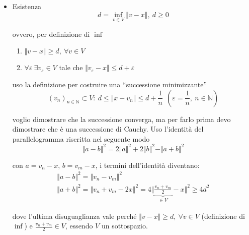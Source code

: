 \documentclass[10pt,a4paper,twoside,openright]{book}
\begin{document}
\begin{dimostrazione}
	
	\begin{itemize}
		\item Esistenza\begin{equation*}
		      d=\inf_{v\in V}\Vert v-x\Vert,\ d\geqslant 0
		\end{equation*}
		
		ovvero, per definizione di $\displaystyle \inf$
		\begin{enumerate}
			\item $\displaystyle \Vert v-x\Vert \geqslant d,\ \forall v\in V$
			\item $\displaystyle \forall \varepsilon \ \exists v_{\varepsilon } \in V$ tale che $\displaystyle \Vert v_{\varepsilon } -x\Vert \leqslant d+\varepsilon $ \ $ $
		\end{enumerate}
		
		uso la definizione per costruire una ``successione minimizzante''
		\begin{equation}
			(v_{n})_{n\in \mathbb{N}} \subset V:\ d\leqslant \Vert x-v_{n}\Vert \leqslant d+\frac{1}{n} \ \ \left( \varepsilon =\frac{1}{n},\ n\in \mathbb{N}\right)
			\label{eq:teo-proiez-suc-min}
		\end{equation}
		
		voglio dimostrare che la successione converga, ma per farlo prima devo dimostrare che è una successione di Cauchy. Uso l'identità del parallelogramma riscritta nel seguente modo\begin{equation*}
		\Vert a-b\Vert ^{2} =2\Vert a\Vert ^{2} +2\Vert b\Vert ^{2} -\Vert a+b\Vert ^{2}
		\end{equation*}
		
		con $\displaystyle a=v_{n} -x$, $\displaystyle b=v_{m} -x$, i termini dell'identità diventano:\begin{equation*}
		\begin{array}{ l }
			\Vert a-b\Vert ^{2} =\Vert v_{n} -v_{m}\Vert ^{2}                                                                                                 \\
			\Vert a+b\Vert ^{2} =\Vert v_{n} +v_{m} -2x\Vert ^{2} =4\bigg\Vert \underbrace{\frac{v_{n} +v_{m}}{2}}_{\in V} -x\bigg\Vert ^{2} \geqslant 4d^{2} 
		\end{array}
		\end{equation*}
		
		dove l'ultima disuguaglianza vale perché $\displaystyle \Vert v-x\Vert \geqslant d,\ \forall v\in V$ (definizione di $\displaystyle \inf$) e $\displaystyle \frac{v_{n} +v_{m}}{2} \in V$, essendo $\displaystyle V$ un sottospazio.
		

\end{itemize}
\end{dimostrazione}
\end{document}

